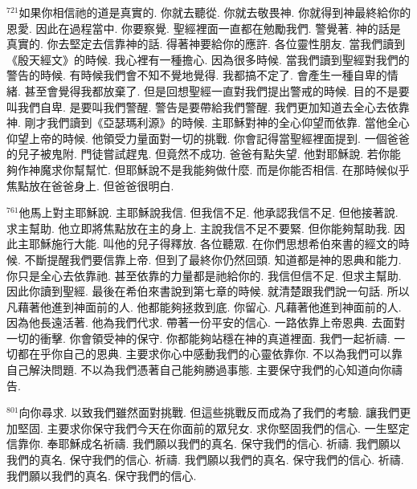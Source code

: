 \documentclass{book}
\begin{document}
$^{721}$如果你相信祂的道是真實的.
你就去聽從.
你就去敬畏神.
你就得到神最終給你的恩愛.
因此在過程當中.
你要察覺.
聖經裡面一直都在勉勵我們.
警覺著.
神的話是真實的.
你去堅定去信靠神的話.
得著神要給你的應許.
各位靈性朋友.
當我們讀到《殷天經文》的時候.
我心裡有一種擔心.
因為很多時候.
當我們讀到聖經對我們的警告的時候.
有時候我們會不知不覺地覺得.
我都搞不定了.
會產生一種自卑的情緒.
甚至會覺得我都放棄了.
但是回想聖經一直對我們提出警戒的時候.
目的不是要叫我們自卑.
是要叫我們警醒.
警告是要帶給我們警醒.
我們更加知道去全心去依靠神.
剛才我們讀到《亞瑟瑪利源》的時候.
主耶穌對神的全心仰望而依靠.
當他全心仰望上帝的時候.
他領受力量面對一切的挑戰.
你會記得當聖經裡面提到.
一個爸爸的兒子被鬼附.
門徒嘗試趕鬼.
但竟然不成功.
爸爸有點失望.
他對耶穌說.
若你能夠作神魔求你幫幫忙.
但耶穌說不是我能夠做什麼.
而是你能否相信.
在那時候似乎焦點放在爸爸身上.
但爸爸很明白.

$^{761}$他馬上對主耶穌說.
主耶穌說我信.
但我信不足.
他承認我信不足.
但他接著說.
求主幫助.
他立即將焦點放在主的身上.
主說我信不足不要緊.
但你能夠幫助我.
因此主耶穌施行大能.
叫他的兒子得釋放.
各位聽眾.
在你們思想希伯來書的經文的時候.
不斷提醒我們要信靠上帝.
但到了最終你仍然回頭.
知道都是神的恩典和能力.
你只是全心去依靠祂.
甚至依靠的力量都是祂給你的.
我信但信不足.
但求主幫助.
因此你讀到聖經.
最後在希伯來書說到第七章的時候.
就清楚跟我們說一句話.
所以凡藉著他進到神面前的人.
他都能夠拯救到底.
你留心.
凡藉著他進到神面前的人.
因為他長遠活著.
他為我們代求.
帶著一份平安的信心.
一路依靠上帝恩典.
去面對一切的衝擊.
你會領受神的保守.
你都能夠站穩在神的真道裡面.
我們一起祈禱.
一切都在乎你自己的恩典.
主要求你心中感動我們的心靈依靠你.
不以為我們可以靠自己解決問題.
不以為我們憑著自己能夠勝過事態.
主要保守我們的心知道向你禱告.

$^{801}$向你尋求.
以致我們雖然面對挑戰.
但這些挑戰反而成為了我們的考驗.
讓我們更加堅固.
主要求你保守我們今天在你面前的眾兒女.
求你堅固我們的信心.
一生堅定信靠你.
奉耶穌成名祈禱.
我們願以我們的真名.
保守我們的信心.
祈禱.
我們願以我們的真名.
保守我們的信心.
祈禱.
我們願以我們的真名.
保守我們的信心.
祈禱.
我們願以我們的真名.
保守我們的信心.
\newpage
\end{document}
